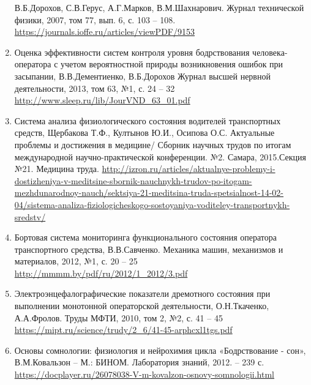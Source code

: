 \begin{enumerate}
    В.Б.Дорохов, С.В.Герус, А.Г.Марков, В.М.Шахнарович. Журнал технической физики, 2007, том 77, вып. 6, с. 103 – 108.
    \url{https://journals.ioffe.ru/articles/viewPDF/9153}
    \item Оценка эффективности систем контроля уровня бодрствования человека-оператора с учетом вероятностной природы возникновения ошибок при засыпании, В.В.Дементиенко, В.Б.Дорохов
    Журнал высшей нервной деятельности, 2013, том 63, №1, с. 24 – 32
    \url{http://www.sleep.ru/lib/JourVND_63_01.pdf}
    \item Система анализа физиологического состояния водителей транспортных \linebreak средств, Щербакова Т.Ф., Култынов Ю.И., Осипова О.С. Актуальные проблемы и достижения в медицине/ Сборник научных трудов по итогам международной научно-практической конференции. №2. Самара, 2015.Секция №21. Медицина труда.
    \url{http://izron.ru/articles/aktualnye-problemy-i-dostizheniya-v-meditsine-sbornik-nauchnykh-trudov-po-itogam-mezhdunarodnoy-nauch/sektsiya-21-meditsina-truda-spetsialnost-14-02-04/sistema-analiza-}\linebreak \url{fiziologicheskogo-sostoyaniya-voditeley-transportnykh-sredstv/}
    \item Бортовая система мониторинга функционального состояния оператора транспортного средства, В.В.Савченко. Механика машин, механизмов и материалов, 2012, №1,  с. 20 – 25
    \url{http://mmmm.by/pdf/ru/2012/1_2012/3.pdf}
    \item Электроэнцефалографические показатели дремотного состояния при выполнении монотонной операторской деятельности, О.Н.Ткаченко, А.А.Фролов. Труды МФТИ, 2010, том 2, №2, с. 41 – 45
    \url{https://mipt.ru/science/trudy/2_6/41-45-arphcxl1tgs.pdf}
    \item Основы сомнологии: физиология и нейрохимия цикла «Бодрствование - сон», В.М.Ковальзон – М.: БИНОМ. Лаборатория знаний, 2012. – 239 с.
    \url{https://docplayer.ru/26078038-V-m-kovalzon-osnovy-somnologii.html} 
\end{enumerate}